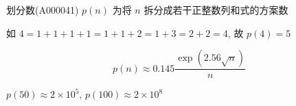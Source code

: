 划分数(A000041) \(p(n)\) 为将 \(n\) 拆分成若干正整数列和式的方案数

如 \(4=1+1+1+1=1+1+2=1+3=2+2=4\), 故 \(p(4)=5\)

\[
    p(n)\approx 0.145 \frac{\exp(2.56\sqrt{n})}{n}
\]

\(p(50)\approx 2\times 10^5\), \(p(100)\approx 2\times 10^8\)
